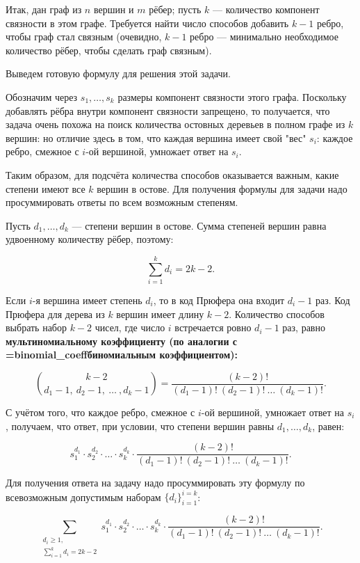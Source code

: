 Итак, дан граф из $n$ вершин и $m$ рёбер; пусть $k$ --- количество компонент связности в этом графе. Требуется найти число способов добавить $k-1$ ребро, чтобы граф стал связным (очевидно, $k-1$ ребро --- минимально необходимое количество рёбер, чтобы сделать граф связным).

Выведем готовую формулу для решения этой задачи.

Обозначим через $s_1, \ldots, s_k$ размеры компонент связности этого графа. Поскольку добавлять рёбра внутри компонент связности запрещено, то получается, что задача очень похожа на поиск количества остовных деревьев в полном графе из $k$ вершин: но отличие здесь в том, что каждая вершина имеет свой "вес" $s_i$: каждое ребро, смежное с $i$-ой вершиной, умножает ответ на $s_i$.

Таким образом, для подсчёта количества способов оказывается важным, какие степени имеют все $k$ вершин в остове. Для получения формулы для задачи надо просуммировать ответы по всем возможным степеням.

Пусть $d_1, \ldots, d_k$ --- степени вершин в остове. Сумма степеней вершин равна удвоенному количеству рёбер, поэтому:

$$ \sum_{i=1}^k d_i = 2k-2. $$

Если $i$-я вершина имеет степень $d_i$, то в код Прюфера она входит $d_i-1$ раз. Код Прюфера для дерева из $k$ вершин имеет длину $k-2$. Количество способов выбрать набор $k-2$ чисел, где число $i$ встречается ровно $d_i-1$ раз, равно \bf{мультиномиальному коэффициенту} (по аналогии с \algohref=binomial_coeff{биномиальным коэффициентом}):

$$ \binom{ k-2 }{ d_1-1, ~ d_2-1, ~ \ldots ~ , d_k-1 } = \frac{ (k-2)! }{ (d_1-1)! ~ (d_2-1)! ~ \ldots ~ (d_k-1)! }. $$

С учётом того, что каждое ребро, смежное с $i$-ой вершиной, умножает ответ на $s_i$, получаем, что ответ, при условии, что степени вершин равны $d_1, \ldots, d_k$, равен:

$$ s_1^{d_1} \cdot s_2^{d_2} \cdot \ldots \cdot s_k^{d_k} \cdot \frac{ (k-2)! }{ (d_1-1)! ~ (d_2-1)! ~ \ldots ~ (d_k-1)! }. $$

Для получения ответа на задачу надо просуммировать эту формулу по всевозможным допустимым наборам $\{ d_i \}_{i=1}^{i=k}$:

$$ \sum_{ \substack{ d_i \ge 1, \\ \sum_{i=1}^k d_i = 2k-2 } } s_1^{d_1} \cdot s_2^{d_2} \cdot \ldots \cdot s_k^{d_k} \cdot \frac{ (k-2)! }{ (d_1-1)! ~ (d_2-1)! ~ \ldots ~ (d_k-1)! }. $$

